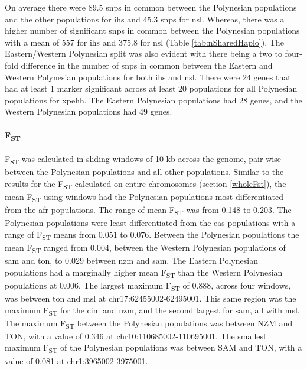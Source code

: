 \documentclass[]{report}
\let\oldparagraph\paragraph
\renewcommand{\paragraph}[1]{\oldparagraph{#1}\mbox{}}
\begin{document}
On average there were 89.5 \glspl{snp} in common between the Polynesian
populations and the other populations for \gls{ihs} and 45.3 \glspl{snp}
for \gls{nsl}. Whereas, there was a higher number of significant
\glspl{snp} in common between the Polynesian populations with a mean of
557 for \gls{ihs} and 375.8 for \gls{nsl} (Table
\ref{tab:nSharedHaplo}). The Eastern/Western Polynesian split was also
evident with there being a two to four-fold difference in the number of
\glspl{snp} in common between the Eastern and Western Polynesian
populations for both \gls{ihs} and \gls{nsl}. There were 24 genes that
had at least 1 marker significant across at least 20 populations for all
Polynesian populations for \gls{xpehh}. The Eastern Polynesian
populations had 28 genes, and the Western Polynesian populations had 49
genes.

\paragraph{\texorpdfstring{F\textsubscript{ST}}{FST}}\label{fst-1}

F\textsubscript{ST} was calculated in sliding windows of 10 kb across
the genome, pair-wise between the Polynesian populations and all other
populations. Similar to the results for the F\textsubscript{ST}
calculated on entire chromosomes (section \ref{wholeFst}), the mean
F\textsubscript{ST} using windows had the Polynesian populations most
differentiated from the \gls{afr} populations. The range of mean
F\textsubscript{ST} was from 0.148 to 0.203. The Polynesian populations
were least differentiated from the \gls{eas} populations with a range of
F\textsubscript{ST} means from 0.051 to 0.076. Between the Polynesian
populations the mean F\textsubscript{ST} ranged from 0.004, between the
Western Polynesian populations of \gls{sam} and \gls{ton}, to 0.029
between \gls{nzm} and \gls{sam}. The Eastern Polynesian populations had
a marginally higher mean F\textsubscript{ST} than the Western Polynesian
populations at 0.006. The largest maximum F\textsubscript{ST} of 0.888,
across four windows, was between \gls{ton} and \gls{msl} at
chr17:62455002-62495001. This same region was the maximum
F\textsubscript{ST} for the \gls{cim} and \gls{nzm}, and the second
largest for \gls{sam}, all with \gls{msl}. The maximum
F\textsubscript{ST} between the Polynesian populations was between NZM
and TON, with a value of 0.346 at chr10:110685002-110695001. The
smallest maximum F\textsubscript{ST} of the Polynesian populations was
between SAM and TON, with a value of 0.081 at chr1:3965002-3975001.
\end{document}

